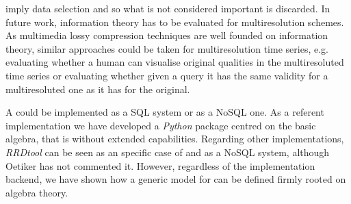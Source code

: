 imply data selection and so what is not considered
important is discarded.
In future work, information
theory has to be evaluated for multiresolution schemes. As multimedia
lossy compression techniques are well founded on information theory,
similar approaches could be taken for multiresolution time series,
e.g. evaluating whether a human can visualise original qualities in
the multiresoluted time series or evaluating
whether given a query it has the same validity for a multiresoluted
one as it has for the original.




A  could be implemented as a SQL  system or as
a NoSQL one. As a referent implementation we have developed a
\emph{Python} package centred on the basic algebra, that is without
extended  capabilities. Regarding other implementations,
\emph{RRDtool} can be seen as an specific case of  and as
a NoSQL system, although Oetiker \cite{rrdtool} has not commented
it. However, regardless of the implementation backend, we have shown
how a generic model for  can be defined firmly rooted on
 algebra theory.





